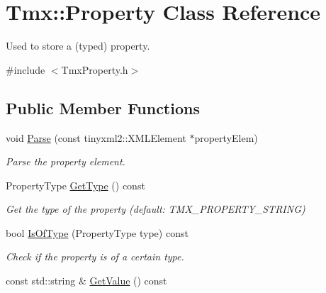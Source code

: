 \hypertarget{classTmx_1_1Property}{\section{Tmx\-:\-:Property Class Reference}
\label{classTmx_1_1Property}
}


Used to store a (typed) property.  




{\ttfamily \#include $<$Tmx\-Property.\-h$>$}

\subsection*{Public Member Functions}
\begin{DoxyCompactItemize}
\item 
\hypertarget{classTmx_1_1Property_a3433bfba5413e8a685832361e03d5dd3}{void \hyperlink{classTmx_1_1Property_a3433bfba5413e8a685832361e03d5dd3}{Parse} (const tinyxml2\-::\-X\-M\-L\-Element $\ast$property\-Elem)}\label{classTmx_1_1Property_a3433bfba5413e8a685832361e03d5dd3}

\begin{DoxyCompactList}\small\item\em Parse the property element. \end{DoxyCompactList}\item 
\hypertarget{classTmx_1_1Property_a044e2f2d7b7b6d331df49a0cf5782375}{Property\-Type \hyperlink{classTmx_1_1Property_a044e2f2d7b7b6d331df49a0cf5782375}{Get\-Type} () const }\label{classTmx_1_1Property_a044e2f2d7b7b6d331df49a0cf5782375}

\begin{DoxyCompactList}\small\item\em Get the type of the property (default\-: T\-M\-X\-\_\-\-P\-R\-O\-P\-E\-R\-T\-Y\-\_\-\-S\-T\-R\-I\-N\-G) \end{DoxyCompactList}\item 
\hypertarget{classTmx_1_1Property_ae969a247c4e494c13c15a96fe8f9c227}{bool \hyperlink{classTmx_1_1Property_ae969a247c4e494c13c15a96fe8f9c227}{Is\-Of\-Type} (Property\-Type type) const }\label{classTmx_1_1Property_ae969a247c4e494c13c15a96fe8f9c227}

\begin{DoxyCompactList}\small\item\em Check if the property is of a certain type. \end{DoxyCompactList}\item 
\hypertarget{classTmx_1_1Property_a3e9c675710a0c442ab18a48d070b1f78}{const std\-::string \& \hyperlink{classTmx_1_1Property_a3e9c675710a0c442ab18a48d070b1f78}{Get\-Value} () const }\label{classTmx_1_1Property_a3e9c675710a0c442ab18a48d070b1f78}


\end{DoxyCompactItemize}
